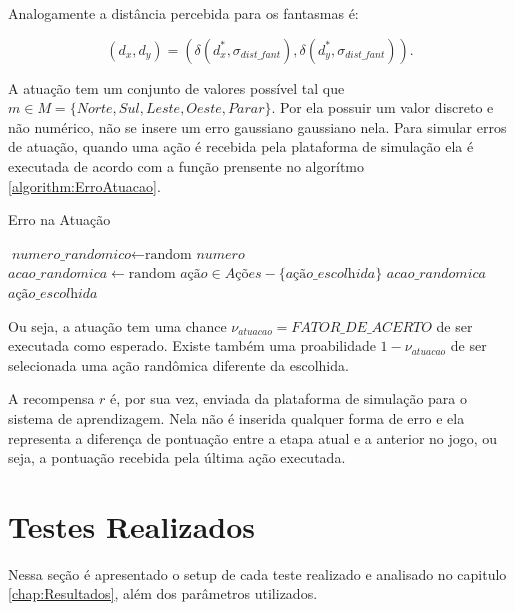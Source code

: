 Analogamente a distância percebida para os fantasmas é:

\begin{equation}
	\left( d_x, d_y \right) = \left( \delta\left( d_x^*, \sigma_{dist\_fant} \right), \delta\left( d_y^*, \sigma_{dist\_fant} \right) \right).
\end{equation}

A atuação tem um conjunto de valores possível tal que $ m \in M = \{ Norte,\allowbreak Sul,\allowbreak Leste,\allowbreak Oeste,\allowbreak Parar \} $. Por ela possuir um valor discreto e não numérico, não se insere um erro gaussiano gaussiano nela. Para simular erros de atuação, quando uma ação é recebida pela plataforma de simulação ela é executada de acordo com a função prensente no algorítmo \ref{algorithm:ErroAtuacao}.

\begin{algorithm}[h]
	\caption{Erro na Atuação} \label{algorithm:ErroAtuacao}
	\begin{algorithmic}[1]
			\State $\textit{numero\_randomico} \gets \text{random }\textit{numero}$
				\State $\textit{acao\_randomica} \gets \text{random }\textit{ação} \in \textit{Ações}-\textit{\{ação\_escolhida\}}$
				\State \Return $\textit{acao\_randomica}$
			\Else
				\State \Return $\textit{ação\_escolhida}$
			\EndIf
		\EndProcedure
	\end{algorithmic}
\end{algorithm}

Ou seja, a atuação tem uma chance $ \nu_{atuacao} = \textit{FATOR\_DE\_ACERTO} $ de ser executada como esperado. Existe também uma proabilidade $ 1 - \nu_{atuacao} $ de ser selecionada uma ação randômica diferente da escolhida.

A recompensa $ r $ é, por sua vez, enviada da plataforma de simulação para o sistema de aprendizagem. Nela não é inserida qualquer forma de erro e ela representa a diferença de pontuação entre a etapa atual e a anterior no jogo, ou seja, a pontuação recebida pela última ação executada.


\section{Testes Realizados} \label{section:TestesRealizados}

Nessa seção é apresentado o setup de cada teste realizado e analisado no capitulo \ref{chap:Resultados}, além dos parâmetros utilizados.

